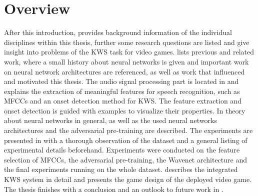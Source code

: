 
\section{Overview}\label{sec:intro_overview}
After this introduction,  provides background information of the individual disciplines within this thesis, further some research questions are listed and give insight into problems of the KWS task for video games.
 lists previous and related work, where a small history about neural networks is given and important work on neural network architectures are referenced, as well as work that influenced and motivated this thesis.
The audio signal processing part is located in  and explains the extraction of meaningful features for speech recognition, such as MFCCs and an onset detection method for KWS.
The feature extraction and onset detection is guided with examples to visualize their properties.
In  theory about neural networks in general, as well as the used neural networks architectures and the adversarial pre-training are described.
The experiments are presented in  with a thorough observation of the dataset and a general listing of experimental details beforehand. 
Experiments were conducted on the feature selection of MFCCs, the adversarial pre-training, the Wavenet architecture and the final experiments running on the whole dataset.
 describes the integrated KWS system in detail and presents the game design of the deployed video game.
The thesis finishes with a conclusion and an outlook to future work in .